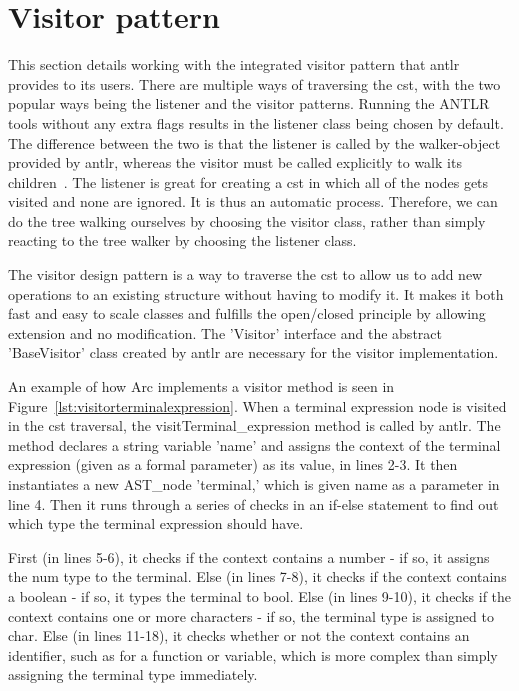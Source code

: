 \section{Visitor pattern}\label{sec:visitorpattern}
This section details working with the integrated visitor pattern that \gls{antlr} provides to its users. There are multiple ways of traversing the \gls{cst}, with the two popular ways being the listener and the visitor patterns. Running the ANTLR tools without any extra flags results in the listener class being chosen by default. The difference between the two is that the listener is called by the walker-object provided by \gls{antlr}, whereas the visitor must be called explicitly to walk its children~\cite{Parr2014}. The listener is great for creating a \gls{cst} in which all of the nodes gets visited and none are ignored. It is thus an automatic process. Therefore, we can do the tree walking ourselves by choosing the visitor class, rather than simply reacting to the tree walker by choosing the listener class.

The visitor design pattern is a way to traverse the \gls{cst} to allow us to add new operations to an existing structure without having to modify it. It makes it both fast and easy to scale classes and fulfills the open/closed principle by allowing extension and no modification. The 'Visitor' interface and the abstract 'BaseVisitor' class created by \gls{antlr} are necessary for the visitor implementation.

An example of how Arc implements a visitor method is seen in Figure~\ref{lst:visitorterminalexpression}. When a terminal expression node is visited in the \gls{cst} traversal, the visitTerminal\_expression method is called by \gls{antlr}. The method declares a string variable 'name' and assigns the context of the terminal expression (given as a formal parameter) as its value, in lines 2-3. It then instantiates a new AST\_node 'terminal,' which is given name as a parameter in line 4. Then it runs through a series of checks in an if-else statement to find out which type the terminal expression should have.

First (in lines 5-6), it checks if the context contains a number - if so, it assigns the num type to the terminal. Else (in lines 7-8), it checks if the context contains a boolean - if so, it types the terminal to bool. Else (in lines 9-10), it checks if the context contains one or more characters - if so, the terminal type is assigned to char. Else (in lines 11-18), it checks whether or not the context contains an identifier, such as for a function or variable, which is more complex than simply assigning the terminal type immediately.




